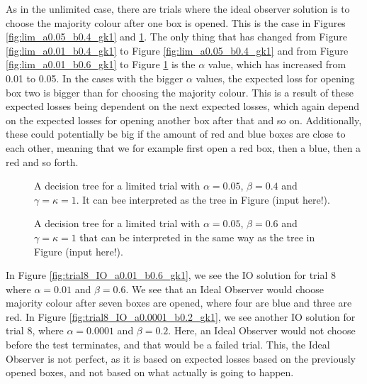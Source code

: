 As in the unlimited case, there are trials where the ideal observer solution is to choose the majority colour after one box is opened. This is the case in Figures \ref{fig:lim_a0.05_b0.4_gk1} and \ref{fig:lim_a0.05_b0.6_gk1}. The only thing that has changed from Figure \ref{fig:lim_a0.01_b0.4_gk1} to Figure \ref{fig:lim_a0.05_b0.4_gk1} and from Figure \ref{fig:lim_a0.01_b0.6_gk1} to Figure \ref{fig:lim_a0.05_b0.6_gk1} is the $\alpha$ value, which has increased from 0.01 to 0.05. In the cases with the bigger $\alpha$ values, the expected loss for opening box two is bigger than for choosing the majority colour. This is a result of these expected losses being dependent on the next expected losses, which again depend on the expected losses for opening another box after that and so on. Additionally, these could potentially be big if the amount of red and blue boxes are close to each other, meaning that we for example first open a red box, then a blue, then a red and so forth. 

\begin{figure}
    \centering
    \begin{minipage}[t]{0.45\textwidth} 
        \centering
        \scalebox{0.8}{}
        \caption{A decision tree for a limited trial with $\alpha = 0.05$, $\beta=0.4$ and $\gamma=\kappa=1$. It can bee interpreted as the tree in Figure (input here!).}
        \label{fig:lim_a0.05_b0.4_gk1}
    \end{minipage}\hfill
    \begin{minipage}[t]{0.45\textwidth} 
        \centering
        \scalebox{0.8}{}
        \caption{A decision tree for a limited trial with $\alpha = 0.05$, $\beta=0.6$ and $\gamma=\kappa=1$ that can be interpreted in the same way as the tree in Figure (input here!).}
        \label{fig:lim_a0.05_b0.6_gk1}
    \end{minipage}
\end{figure}

In Figure \ref{fig:trial8_IO_a0.01_b0.6_gk1}, we see the IO solution for trial 8 where $\alpha=0.01$ and $\beta=0.6$. We see that an Ideal Observer would choose majority colour after seven boxes are opened, where four are blue and three are red. In Figure \ref{fig:trial8_IO_a0.0001_b0.2_gk1}, we see another IO solution for trial 8, where $\alpha=0.0001$ and $\beta=0.2$. Here, an Ideal Observer would not choose before the test terminates, and that would be a failed trial. This, the Ideal Observer is not perfect, as it is based on expected losses based on the previously opened boxes, and not based on what actually is going to happen.

